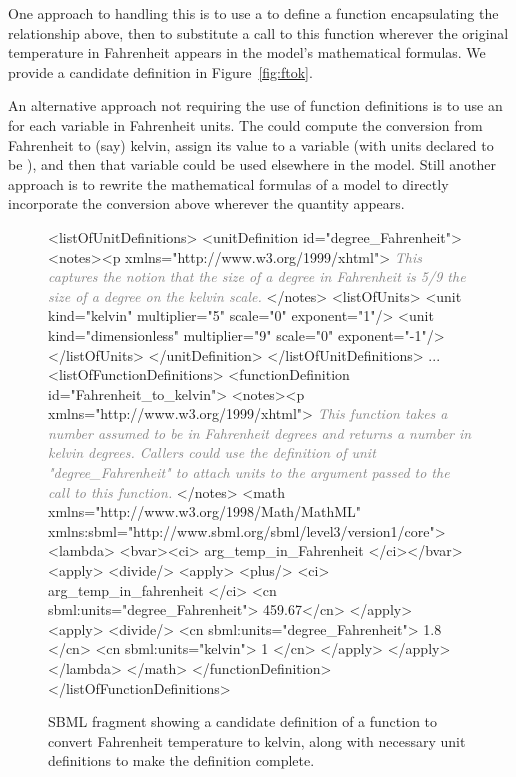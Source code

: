 \begin{itemize}
  One approach to handling this is to use a \FunctionDefinition to
  define a function encapsulating the relationship above, then to
  substitute a call to this function wherever the original
  temperature in Fahrenheit appears in the model's mathematical
  formulas.  We provide a candidate definition in
  Figure~\vref{fig:ftok}. 

  An alternative approach not requiring the use of function
  definitions is to use an \AssignmentRule for each variable in
  Fahrenheit units.  The \AssignmentRule could compute the
  conversion from Fahrenheit to (say) kelvin, assign its value to
  a variable (with units declared to be ), and then
  that variable could be used elsewhere in the model.  Still
  another approach is to rewrite the mathematical formulas of a
  model to directly incorporate the conversion above wherever the
  quantity appears.

\end{itemize}

\begin{figure}
  \begin{example}
<listOfUnitDefinitions>
    <unitDefinition id="degree_Fahrenheit">
        <notes><p xmlns="http://www.w3.org/1999/xhtml">
            \textcolor{gray}{\emph{This captures the notion that the size of a degree in Fahrenheit is 5/9 the size
            of a degree on the kelvin scale.}}
        </notes>
        <listOfUnits>
            <unit kind="kelvin"        multiplier="5" scale="0" exponent="1"/>
            <unit kind="dimensionless" multiplier="9" scale="0" exponent="-1"/>
        </listOfUnits>
    </unitDefinition>
</listOfUnitDefinitions>
...
<listOfFunctionDefinitions>
    <functionDefinition id="Fahrenheit_to_kelvin">
        <notes><p xmlns="http://www.w3.org/1999/xhtml">
            \textcolor{gray}{\emph{This function takes a number assumed to be in Fahrenheit degrees and returns a number
            in kelvin degrees.  Callers could use the definition of unit "degree_Fahrenheit" to
            attach units to the argument passed to the call to this function.}} 
        </notes>
        <math xmlns="http://www.w3.org/1998/Math/MathML"
              xmlns:sbml="http://www.sbml.org/sbml/level3/version1/core">
            <lambda>
                <bvar><ci> arg_temp_in_Fahrenheit </ci></bvar>
                <apply>
                    <divide/>
                    <apply>
                        <plus/>
                        <ci> arg_temp_in_fahrenheit </ci>
                        <cn sbml:units="degree_Fahrenheit"> 459.67</cn>
                    </apply>
                    <apply>
                        <divide/>
                        <cn sbml:units="degree_Fahrenheit"> 1.8 </cn>
                        <cn sbml:units="kelvin"> 1 </cn>
                    </apply>
                </apply>
            </lambda>
        </math>
    </functionDefinition>
</listOfFunctionDefinitions>
\end{example}
\caption{SBML fragment showing a candidate definition of a
  function to convert Fahrenheit temperature to kelvin, along with
  necessary unit definitions to make the definition complete.}
    \label{fig:ftok}
\end{figure}

